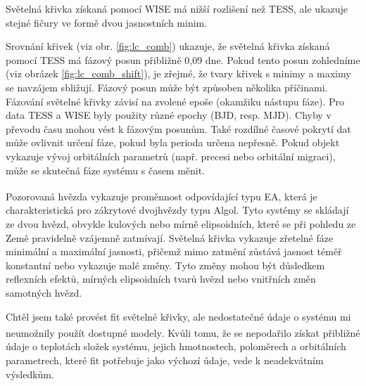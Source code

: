 \documentclass[a4paper,11pt,twocolumn]{article}
\begin{document}
        Světelná křivka získaná pomocí WISE má nižší rozlišení než TESS, ale ukazuje stejné fičury ve formě dvou jasnostních minim. 

        Srovnání křivek (viz obr. \ref{fig:lc_comb}) ukazuje, že světelná křivka získaná pomocí TESS má fázový posun přibližně 0,09 dne. Pokud tento posun zohledníme (viz obrázek \ref{fig:lc_comb_shift}), je zřejmé, že tvary křivek s minimy a maximy se navzájem sbližují. Fázový posun může být způsoben několika příčinami. Fázování světelné křivky závisí na zvolené epoše (okamžiku nástupu fáze). Pro data TESS a WISE byly použity různé epochy (BJD, resp. MJD). Chyby v převodu času mohou vést k fázovým posunům. Také rozdílné časové pokrytí dat může ovlivnit určení fáze, pokud byla perioda určena nepřesně. Pokud objekt vykazuje vývoj orbitálních parametrů (např. precesi nebo orbitální migraci), může se skutečná fáze systému s časem měnit.

        Pozorovaná hvězda vykazuje proměnnost odpovídající typu EA\textsuperscript{\cite{vsx}}, která je charakteristická pro zákrytové dvojhvězdy typu Algol. Tyto systémy se skládají ze dvou hvězd, obvykle kulových nebo mírně elipsoidních, které se při pohledu ze Země pravidelně vzájemně zatmívají. Světelná křivka vykazuje zřetelné fáze minimální a maximální jasnosti, přičemž mimo zatmění zůstává jasnost téměř konstantní nebo vykazuje malé změny. Tyto změny mohou být důsledkem reflexních efektů, mírných elipsoidních tvarů hvězd nebo vnitřních změn samotných hvězd. 

        Chtěl jsem také provést fit světelné křivky, ale nedostatečné údaje o systému mi neumožnily použít dostupné modely\textsuperscript{\cite{elisa}}\textsuperscript{\cite{eb}}. Kvůli tomu, že se nepodařilo získat přibližné údaje o teplotách složek systému, jejich hmotnostech, poloměrech a orbitálních parametrech, které fit potřebuje jako výchozí údaje, vede k neadekvátním výsledkům. 

    
    \nocite{*}
    
\end{document}
